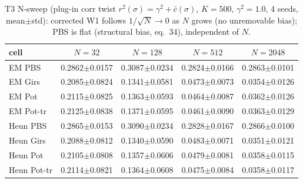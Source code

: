 \begin{table}[ht]
\centering
\caption{T3 N-sweep (plug-in corr twist $r^2(\sigma)=\gamma^2+\bar c(\sigma)$, $K=500$, $\gamma^2=1.0$, 4 seeds, mean$\pm$std): corrected W1 follows $1/\sqrt{N}\to 0$ as $N$ grows (no unremovable bias); PBS is flat (structural bias, eq.~34), independent of $N$.}
\label{tab:toy_t3_n}
\begin{tabular}{lcccc}
\toprule
cell & $N=32$ & $N=128$ & $N=512$ & $N=2048$ \\
\midrule
EM PBS & 0.2862$\pm$0.0157 & 0.3087$\pm$0.0234 & 0.2824$\pm$0.0166 & 0.2863$\pm$0.0101 \\
EM Girs & 0.2085$\pm$0.0824 & 0.1341$\pm$0.0581 & 0.0473$\pm$0.0073 & 0.0354$\pm$0.0126 \\
EM Pot & 0.2115$\pm$0.0825 & 0.1363$\pm$0.0593 & 0.0464$\pm$0.0087 & 0.0362$\pm$0.0126 \\
EM Pot-tr & 0.2125$\pm$0.0838 & 0.1371$\pm$0.0595 & 0.0461$\pm$0.0090 & 0.0363$\pm$0.0129 \\
Heun PBS & 0.2865$\pm$0.0153 & 0.3090$\pm$0.0234 & 0.2828$\pm$0.0167 & 0.2866$\pm$0.0100 \\
Heun Girs & 0.2088$\pm$0.0812 & 0.1340$\pm$0.0590 & 0.0483$\pm$0.0071 & 0.0351$\pm$0.0121 \\
Heun Pot & 0.2105$\pm$0.0808 & 0.1357$\pm$0.0606 & 0.0479$\pm$0.0081 & 0.0358$\pm$0.0115 \\
Heun Pot-tr & 0.2114$\pm$0.0821 & 0.1364$\pm$0.0608 & 0.0475$\pm$0.0084 & 0.0358$\pm$0.0117 \\
\bottomrule
\end{tabular}
\end{table}
